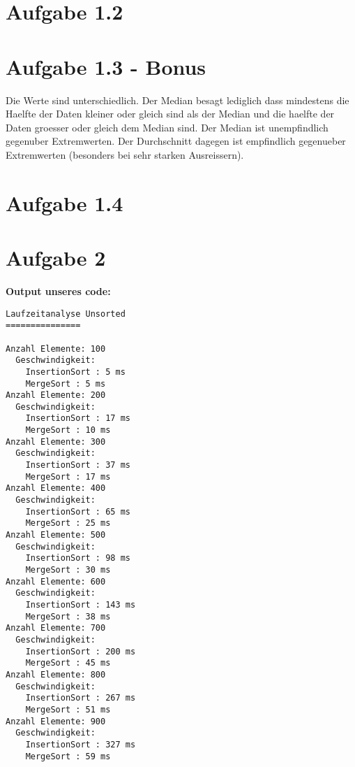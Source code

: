 \documentclass[12pt]{article}
\begin{document}
\lstset{language=C}

\section*{Aufgabe 1.2}



\section*{Aufgabe 1.3 - Bonus}
Die Werte sind unterschiedlich. Der Median besagt lediglich dass mindestens die Haelfte der Daten kleiner oder gleich sind als der Median und die haelfte der Daten groesser oder gleich dem Median sind. Der Median ist unempfindlich gegenuber Extremwerten. Der Durchschnitt dagegen ist empfindlich gegenueber Extremwerten (besonders bei sehr starken Ausreissern).



\section*{Aufgabe 1.4}


\section*{Aufgabe 2}

\textbf{Output unseres code:}\\
\begin{verbatim}
Laufzeitanalyse Unsorted
===============
 
Anzahl Elemente: 100
  Geschwindigkeit:
    InsertionSort : 5 ms
    MergeSort : 5 ms
Anzahl Elemente: 200
  Geschwindigkeit:
    InsertionSort : 17 ms
    MergeSort : 10 ms
Anzahl Elemente: 300
  Geschwindigkeit:
    InsertionSort : 37 ms
    MergeSort : 17 ms
Anzahl Elemente: 400
  Geschwindigkeit:
    InsertionSort : 65 ms
    MergeSort : 25 ms
Anzahl Elemente: 500
  Geschwindigkeit:
    InsertionSort : 98 ms
    MergeSort : 30 ms
Anzahl Elemente: 600
  Geschwindigkeit:
    InsertionSort : 143 ms
    MergeSort : 38 ms
Anzahl Elemente: 700
  Geschwindigkeit:
    InsertionSort : 200 ms
    MergeSort : 45 ms
Anzahl Elemente: 800
  Geschwindigkeit:
    InsertionSort : 267 ms
    MergeSort : 51 ms
Anzahl Elemente: 900
  Geschwindigkeit:
    InsertionSort : 327 ms
    MergeSort : 59 ms
\end{verbatim}
\end{document}
